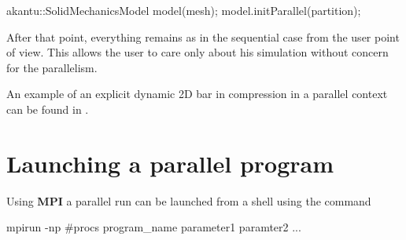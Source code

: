 \begin{cpp}
  akantu::SolidMechanicsModel model(mesh);
  model.initParallel(partition);
\end{cpp}

After that point, everything remains as in the sequential case from
the user point of view. This allows the user to care only
about his simulation without concern for the parallelism.

An example of an explicit dynamic 2D bar in compression in a parallel
context can be found in .

\section{Launching a parallel program}

Using \textbf{MPI} a parallel run can be launched from a shell
using the command

\begin{cpp}
  mpirun -np #procs program_name parameter1 paramter2 ...
\end{cpp}

